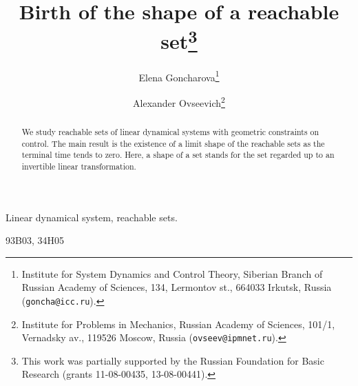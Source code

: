 \documentclass[final]{siamltex}
\begin{document}
\title{Birth of the shape of a reachable set\thanks{This
        work was partially supported by the Russian Foundation for Basic Research (grants  11-08-00435, 13-08-00441).}}

\author{Elena Goncharova\thanks{Institute for System Dynamics and Control Theory, Siberian Branch of Russian Academy of Sciences,
        134, Lermontov st., 664033 Irkutsk, Russia
        ({\tt goncha@icc.ru}).}
        \and Alexander Ovseevich\thanks{Institute for Problems in Mechanics, Russian Academy of Sciences, 101/1, Vernadsky av.,
        119526 Moscow, Russia ({\tt ovseev@ipmnet.ru}).}}

\maketitle
\begin{abstract}
We study reachable sets of linear dynamical systems with geometric constraints
on control. The main result is the existence of a limit shape of the reachable
sets as the terminal time tends to zero. Here, a shape of a set stands for the
set regarded up to an invertible linear transformation.
\end{abstract}

\begin{keywords}
Linear dynamical system, reachable sets.
\end{keywords}

\begin{AMS}
93B03, 34H05
\end{AMS}

\pagestyle{myheadings} \thispagestyle{plain} 

\noindent
\end{document}

